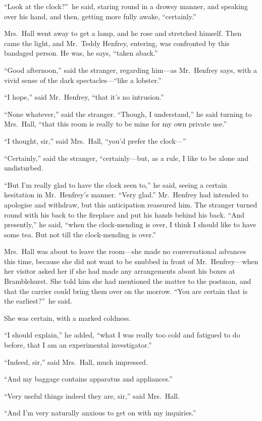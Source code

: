“Look at the clock?”\ he said, staring round in a drowsy manner, and speaking over his hand, and then, getting more fully awake, “certainly.”

Mrs.\ Hall went away to get a lamp, and he rose and stretched himself. Then came the light, and Mr.\ Teddy Henfrey, entering, was confronted by this bandaged person. He was, he says, “taken aback.”

“Good afternoon,” said the stranger, regarding him—as Mr.\ Henfrey says, with a vivid sense of the dark specta\-cles—“like a lobster.”

“I hope,” said Mr.\ Henfrey, “that it’s no intrusion.”

“None whatever,” said the stranger. “Though, I understand,” he said turning to Mrs.\ Hall, “that this room is really to be mine for my own private use.”

“I thought, sir,” said Mrs.\ Hall, “you’d prefer the clock—”

“Certainly,” said the stranger, “certainly—but, as a rule, I like to be alone and undisturbed.

“But I’m really glad to have the clock seen to,” he said, seeing a certain hesitation in Mr.\ Henfrey’s manner. “Very glad.” Mr.\ Henfrey had intended to apologise and withdraw, but this anticipation reassured him. The stranger turned round with his back to the fireplace and put his hands behind his back. “And presently,” he said, “when the clock-mending is over, I think I should like to have some tea. But not till the clock-mending is over.”

Mrs.\ Hall was about to leave the room—she made no conversational advances this time, because she did not want to be snubbed in front of Mr.\ Henfrey—when her visitor asked her if she had made any arrangements about his boxes at Bramblehurst. She told him she had mentioned the matter to the postman, and that the carrier could bring them over on the morrow. “You are certain that is the earliest?”\ he said.

She was certain, with a marked coldness.

“I should explain,” he added, “what I was really too cold and fatigued to do before, that I am an experimental investigator.”

“Indeed, sir,” said Mrs.\ Hall, much impressed.

“And my baggage contains apparatus and appliances.”

“Very useful things indeed they are, sir,” said Mrs.\ Hall.

“And I’m very naturally anxious to get on with my in\-quiries.”

